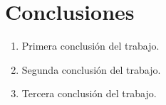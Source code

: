 
\section{Conclusiones}

\begin{enumerate}
  \item Primera conclusión del trabajo.
  \item Segunda conclusión del trabajo.
  \item Tercera conclusión del trabajo.
\end{enumerate}
